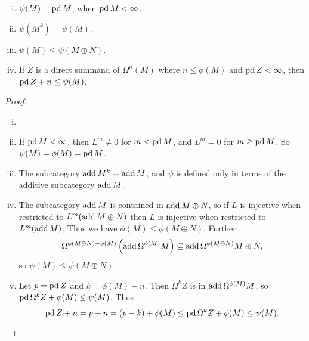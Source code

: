 \begin{lemma} \cite[Lemma~3]{IgTo05} \label{lem:properties_of_psi}
	\begin{enumerate}[i)]
		\item $\psi(M) = \operatorname{pd} M$, when $\operatorname{pd} M < \infty$.
		\item $\psi(M^k) = \psi(M)$.
		\item $\psi(M) \leq \psi(M\oplus N)$.
		\item If $Z$ is a direct summand of $\Omega^n(M)$ where $n \leq \phi(M)$ and $\operatorname{pd} Z < \infty$, then $\operatorname{pd} Z + n \leq \psi(M)$.
	\end{enumerate}
	\begin{proof}
		\begin{enumerate}[i)]
			\item[] %
			\item If $\operatorname{pd} M < \infty$, then $L^m \neq 0$ for $m < \operatorname{pd} M$, and $L^m =0$ for $m \geq \operatorname{pd} M$. So $\psi(M)=\phi(M)=\operatorname{pd} M$.
			\item The subcategory $\operatorname{add} M^k = \operatorname{add} M$, and $\psi$ is defined only in terms of the additive subcategory $\operatorname{add} M$.
			\item  The subcategory $\operatorname{add} M$ is contained in $\operatorname{add} M\oplus N$, so if $L$ is injective when restricted to $L^m(\operatorname{add} M\oplus N)$ then $L$ is injective when restricted to $L^m(\operatorname{add} M)$. Thus we have $\phi(M) \leq \phi({M\oplus N})$. Further $$\Omega^{\phi({M\oplus N})-\phi(M)}\left(\operatorname{add}\Omega^{\phi(M)}M \right) \subseteq \operatorname{add}\Omega^{\phi({M\oplus N})} M\oplus N,$$ 
			so $\psi(M) \leq \psi(M\oplus N)$.
			\item Let $p=\operatorname{pd} Z$ and $k = \phi(M) - n$. Then $\Omega^k Z$ is in $\operatorname{add} \Omega^{\phi(M)}M$, so $\operatorname{pd}\Omega^k Z + \phi(M) \leq \psi(M)$. Thus $$\operatorname{pd} Z + n = p + n = (p-k) + \phi(M) \leq \operatorname{pd}\Omega^k Z + \phi(M) \leq \psi(M).$$
		\end{enumerate}
	\end{proof}
\end{lemma}

